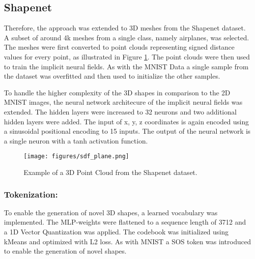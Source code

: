\subsection*{Shapenet}

Therefore, the approach was extended to 3D meshes from the Shapenet dataset. A subset of around 4k meshes from a single class, namely airplanes, was selected. The meshes were first converted to point clouds representing signed distance values for every point, as illustrated in Figure \ref{fig:airplane}. The point clouds were then used to train the implicit neural fields. As with the MNIST Data a single sample from the dataset was overfitted and then used to initialize the other samples.








To handle the higher complexity of the 3D shapes in comparison to the 2D MNIST images, the neural network architecure of the implicit neural fields was extended. The hidden layers were increased to 32 neurons and two additional hidden layers were added. The input of x, y, z coordinates is again encoded using a sinusoidal positional encoding to 15 inputs. The output of the neural network is a single neuron with a tanh activation function.


\begin{figure}[H]
  \centering
  \texttt{[image: figures/sdf\_plane.png]}
  \caption{Example of a 3D Point Cloud from the Shapenet dataset.}
  \label{fig:airplane}
\end{figure}



\subsubsection*{Tokenization:}

To enable the generation of novel 3D shapes, a learned vocabulary was implemented. The MLP-weights were flattened to a sequence length of 3712 and a 1D Vector Quantization was applied. The codebook was initialized using kMeans and optimized with L2 loss. As with MNIST a SOS token was introduced to enable the generation of novel shapes.

